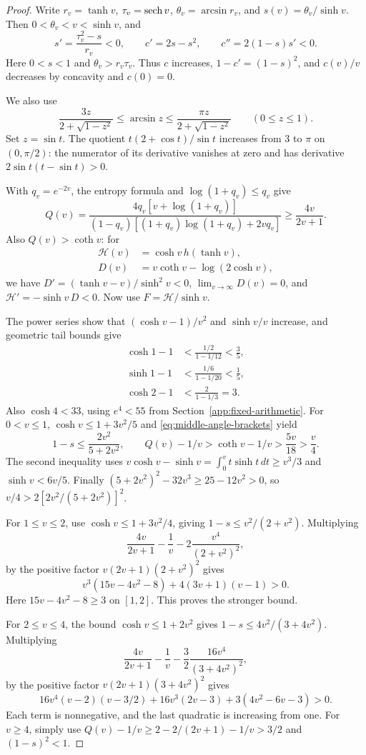 \begin{proof}
Write
\(r_v=\tanh v\), \(\tau_v=\operatorname{sech} v\),
\(\theta_v=\arcsin r_v\), and \(s(v)=\theta_v/\sinh v\).
Then \(0<\theta_v<v<\sinh v\), and
\[
 s'=\frac{\tau_v^2-s}{r_v}<0,\qquad
 c'=2s-s^2,\qquad c''=2(1-s)s'<0.
\]
Here \(0<s<1\) and \(\theta_v>r_v\tau_v\). Thus \(c\) increases,
\(1-c'=(1-s)^2\), and \(c(v)/v\) decreases by concavity and \(c(0)=0\).

We also use
\begin{equation}
 \frac{3z}{2+\sqrt{1-z^2}}\le\arcsin z
 \le\frac{\pi z}{2+\sqrt{1-z^2}}
 \qquad(0\le z\le1).
 \label{eq:middle-angle-brackets}
\end{equation}
Set \(z=\sin t\). The quotient \(t(2+\cos t)/\sin t\)
increases from \(3\) to \(\pi\) on
\((0,\pi/2)\): the numerator of its derivative vanishes at zero
and has derivative \(2\sin t(t-\sin t)>0\).

With \(q_v=e^{-2v}\), the entropy formula and
\(\log(1+q_v)\le q_v\) give
\[
 Q(v)=\frac{4q_v[v+\log(1+q_v)]}
 {(1-q_v)[(1+q_v)\log(1+q_v)+2vq_v]}
 \ge\frac{4v}{2v+1}.
\]
Also \(Q(v)>\coth v\): for
\begin{align*}
 \mathcal H(v)&=\cosh v\,h(\tanh v),\\
 D(v)&=v\coth v-\log(2\cosh v),
\end{align*}
we have \(D'=(\tanh v-v)/\sinh^2v<0\),
\(\lim_{v\to\infty}D(v)=0\), and
\(\mathcal H'=-\sinh v\,D<0\). Now use \(F=\mathcal H/\sinh v\).

The power series show that \((\cosh v-1)/v^2\) and \(\sinh v/v\)
increase, and geometric tail bounds give
\begin{align*}
 \cosh1-1&<\frac{1/2}{1-1/12}<\frac35,\\
 \sinh1-1&<\frac{1/6}{1-1/20}<\frac15,\\
 \cosh2-1&<\frac2{1-1/3}=3.
\end{align*}
Also \(\cosh4<33\), using \(e^4<55\) from
Section~\ref{app:fixed-arithmetic}.
For \(0<v\le1\), \(\cosh v\le1+3v^2/5\) and
\eqref{eq:middle-angle-brackets} yield
\[
 1-s\le\frac{2v^2}{5+2v^2},\qquad
 Q(v)-1/v>\coth v-1/v>\frac{5v}{18}>\frac v4.
\]
The second inequality uses
\(v\cosh v-\sinh v=\int_0^v t\sinh t\,dt\ge v^3/3\) and
\(\sinh v<6v/5\). Finally
\((5+2v^2)^2-32v^3\ge25-12v^2>0\), so
\(v/4>2[2v^2/(5+2v^2)]^2\).

For \(1\le v\le2\), use \(\cosh v\le1+3v^2/4\), giving
\(1-s\le v^2/(2+v^2)\). Multiplying
\[
 \frac{4v}{2v+1}-\frac1v-2\frac{v^4}{(2+v^2)^2},
\]
by the positive factor \(v(2v+1)(2+v^2)^2\) gives
\[
 v^3(15v-4v^2-8)+4(3v+1)(v-1)>0.
\]
Here \(15v-4v^2-8\ge3\) on \([1,2]\). This proves the stronger bound.

For \(2\le v\le4\), the bound \(\cosh v\le1+2v^2\) gives
\(1-s\le4v^2/(3+4v^2)\). Multiplying
\[
 \frac{4v}{2v+1}-\frac1v-\frac32
                   \frac{16v^4}{(3+4v^2)^2},
\]
by the positive factor \(v(2v+1)(3+4v^2)^2\) gives
\[
 16v^4(v-2)(v-3/2)+16v^3(2v-3)+3(4v^2-6v-3)>0.
\]
Each term is nonnegative, and the last quadratic is increasing
from one. For \(v\ge4\), simply use
\(Q(v)-1/v\ge2-2/(2v+1)-1/v>3/2\) and \((1-s)^2<1\).
\end{proof}
